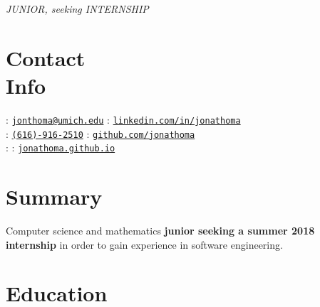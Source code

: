 \documentclass[margin,line]{resume}
\begin{document}
 {\hfill\textsl{\large JUNIOR, seeking INTERNSHIP}}
      
\begin{resume}
	\vspace{-3.5mm}
	\section{\mysidestyle Contact\\Info}
	\noindent \faEnvelope : \href{mailto:jonthoma@umich.edu}{\nolinkurl{jonthoma@umich.edu}} \hfill \faLinkedinSign : \href{https://linkedin.com/in/jonathoma}{\nolinkurl{linkedin.com/in/jonathoma}}\\
	\noindent \faPhone : \href{tel:+1-616-916-2510}{\nolinkurl{(616)-916-2510}} \hfill \faGithub : \href{https://github.com/jonathoma}{\nolinkurl{github.com/jonathoma}} \\ 
	\faHome : \rmfamily \hfill  \faUser : \href{https://jonathoma.github.io}{\nolinkurl{jonathoma.github.io}} \\
	\vspace{-2.5mm}
	    
	\sectionbreak
	\vspace{-3.5mm}
	\section{\mysidestyle Summary}
	Computer science and mathematics \textbf{junior seeking a summer 2018 internship} in order to gain experience in software engineering. \vspace{-2.5mm}\\ 
	    
	\sectionbreak
	\vspace{-2.5mm}
	\section{\mysidestyle Education}
	

\end{resume}
\end{document}
